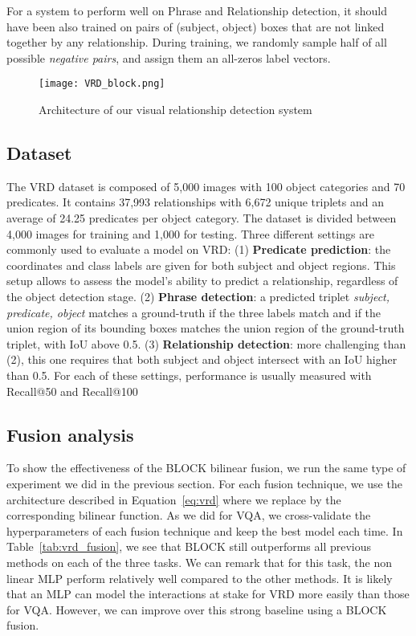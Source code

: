 \documentclass[letterpaper]{article} \usepackage{aaai19}  \usepackage{times}  \usepackage{helvet}  \usepackage{courier}  \usepackage{url}  \usepackage{graphicx}  \usepackage{booktabs}       \usepackage{comment}
\begin{document}
For a system to perform well on Phrase and Relationship detection, it should have been also trained on pairs of (subject, object) boxes that are not linked together by any relationship. During training, we randomly sample half of all possible \textit{negative pairs}, and assign them an all-zeros label vectors. 

\begin{figure}
    \centering
    \texttt{[image: VRD\_block.png]}
    \caption{\label{fig:vrd_archi} Architecture of our visual relationship detection system}
\end{figure}

\subsection{Dataset}
The VRD dataset \cite{VRD_Lu_2016_ECCV} is composed of 5,000 images with 100 object categories and 70 predicates. It contains 37,993 relationships with 6,672 unique triplets and an average of 24.25 predicates per object category. The dataset is divided between 4,000 images for training and 1,000 for testing.
Three different settings are commonly used to evaluate a model on VRD:
(1) \textbf{Predicate prediction}: the coordinates and class labels are given for both subject and object regions. This setup allows to assess the model's ability to predict a relationship, regardless of the object detection stage. 
(2) \textbf{Phrase detection}: a predicted triplet \textit{subject, predicate, object} matches a ground-truth if the three labels match and if the union region of its bounding boxes matches the union region of the ground-truth triplet, with IoU above 0.5.
(3) \textbf{Relationship detection}: more challenging than (2), this one requires that both subject and object intersect with an IoU higher than 0.5. For each of these settings, performance is usually measured with Recall@50 and Recall@100

\subsection{Fusion analysis}
To show the effectiveness of the BLOCK bilinear fusion, we run the same type of experiment we did in the previous section. For each fusion technique, we use the architecture described in Equation~\ref{eq:vrd} where we replace  by the corresponding bilinear function. As we did for VQA, we cross-validate the hyperparameters of each fusion technique and keep the best model each time.
In Table~\ref{tab:vrd_fusion}, we see that BLOCK still outperforms all previous methods on each of the three tasks. 
We can remark that for this task, the non linear MLP perform relatively well compared to the other methods. It is likely that an MLP can model the interactions at stake for VRD more easily than those for VQA. However, we can improve over this strong baseline using a BLOCK fusion. 
\end{document}
